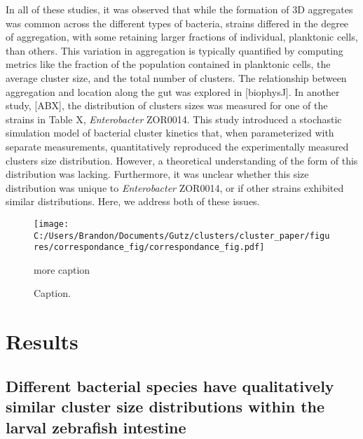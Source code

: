 \documentclass[aps,pre,twocolumn]{revtex4-1}
\begin{document}
In all of these studies, it was observed that while the formation of 3D aggregates was common across the different types of bacteria, strains differed in the degree of aggregation, with some retaining larger fractions of individual, planktonic cells, than others. This variation in aggregation is typically quantified by computing metrics like the fraction of the population contained in planktonic cells, the average cluster size, and the total number of clusters. The relationship between aggregation and location along the gut was explored in [biophysJ]. In another study, [ABX], the distribution of clusters sizes was measured for one of the strains in Table X, \textit{Enterobacter} ZOR0014. This study introduced a stochastic simulation model of bacterial cluster kinetics that, when parameterized with separate measurements, quantitatively reproduced the experimentally measured clusters size distribution. However, a theoretical understanding of the form of this distribution was lacking. Furthermore, it was unclear whether this size distribution was unique to  \textit{Enterobacter} ZOR0014, or if other strains exhibited similar distributions. Here, we address both of these issues. 
 \begin{figure*}%
	\centerline{
		\texttt{[image: C:/Users/Brandon/Documents/Gutz/clusters/cluster\_paper/figures/correspondance\_fig/correspondance\_fig.pdf]}}
	\caption{Caption.}{more caption}
	\label{fig:correspondance-fig}
\end{figure*}


\section{Results}
\subsection{Different bacterial species have qualitatively similar cluster size distributions within the larval zebrafish intestine}
\end{document}
